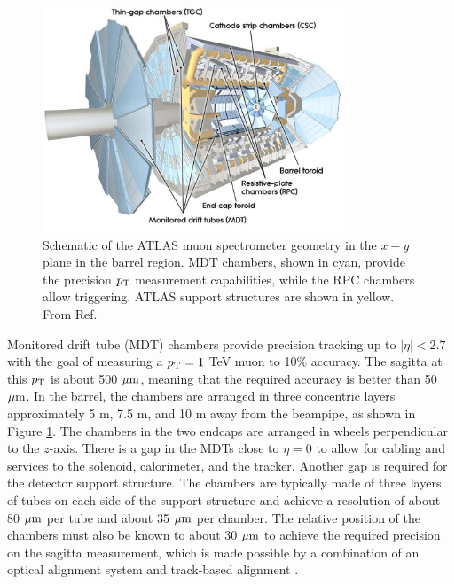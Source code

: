\begin{figure}[h]
  \centering
  \includegraphics[width=0.8\textwidth]{figures/experiment/muonspectrometer}
  \caption[The ATLAS muon spectrometer.]{Schematic of the ATLAS muon
  spectrometer geometry in the $x-y$ plane in the barrel region. MDT
  chambers, shown in cyan, provide the precision $p_{\text{T}}$ measurement
  capabilities, while the RPC chambers allow triggering. ATLAS support
  structures are shown in yellow.
  From Ref. \cite{Aad:2010ag}}
   \label{fig:exp:ms}
\end{figure}

Monitored drift tube (MDT) chambers provide precision tracking up to
$|\eta| < 2.7$ with the goal of measuring a $p_{\text{T}} = 1$ TeV muon
to 10\% accuracy. The sagitta at this $p_{\text{T}}$ is about 500 $\mu\text{m}$,
meaning that the required accuracy is better than 50 $\mu\text{m}$.
In the barrel, the chambers are arranged in three concentric
layers approximately 5 m, 7.5 m, and 10 m away from the beampipe, as
shown in Figure \ref{fig:exp:ms}. The chambers in the two endcaps are
arranged in wheels perpendicular to the $z$-axis. There is a gap in
the MDTs close to $\eta = 0$ to allow for cabling and services to
the solenoid, calorimeter, and the tracker. Another gap is required
for the detector support structure. The chambers are typically
made of three layers of tubes on each side of the support structure
and achieve a resolution of about 80 $\mu\text{m}$ per tube and about
35 $\mu\text{m}$ per chamber. The relative position of the chambers must also be
known to about 30 $\mu\text{m}$ to achieve the required precision on the sagitta
measurement, which is made possible by a combination of an optical alignment
system and track-based alignment \cite{Aad:2010ag, Aefsky:1380912, Aad:2008zzm}.


